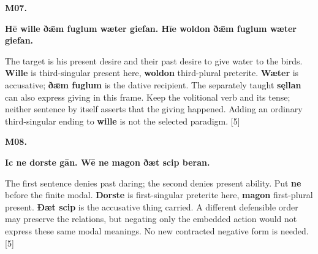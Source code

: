 \par\begin{minipage}{\linewidth}\raggedright
\textbf{M07.}

\textbf{Hē wille ðǣm fuglum wæter giefan. Hīe woldon ðǣm fuglum wæter giefan.}

The target is his present desire and their past desire to give water to the birds. \textbf{Wille} is third-singular present here, \textbf{woldon} third-plural preterite. \textbf{Wæter} is accusative; \textbf{ðǣm fuglum} is the dative recipient. The separately taught \textbf{sęllan} can also express giving in this frame. Keep the volitional verb and its tense; neither sentence by itself asserts that the giving happened. Adding an ordinary third-singular ending to \textbf{wille} is not the selected paradigm. [5]

\end{minipage}\par\addvspace{4pt}

\par\begin{minipage}{\linewidth}\raggedright
\textbf{M08.}

\textbf{Ic ne dorste gān. Wē ne magon ðæt scip beran.}

The first sentence denies past daring; the second denies present ability. Put \textbf{ne} before the finite modal. \textbf{Dorste} is first-singular preterite here, \textbf{magon} first-plural present. \textbf{Ðæt scip} is the accusative thing carried. A different defensible order may preserve the relations, but negating only the embedded action would not express these same modal meanings. No new contracted negative form is needed. [5]

\end{minipage}\par\addvspace{4pt}

